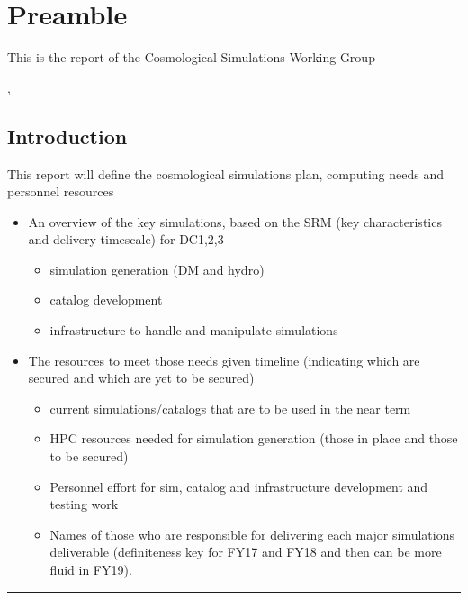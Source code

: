 \section{Preamble}
\resetnumbering
\label{sec:preamble}

This is the report of the Cosmological Simulations Working Group

\vspace{\baselineskip}

,




\subsection{Introduction}
\label{sec:preamble:introduction}

This report will define the cosmological simulations plan, computing needs and personnel resources

\begin{itemize}
   \item    An overview of the key simulations, based on the SRM (key characteristics and delivery timescale) for DC1,2,3
     \begin{itemize}
        \item        simulation generation (DM and hydro)
        \item        catalog development
        \item        infrastructure to handle and manipulate simulations
     \end{itemize}
   \item    The resources to meet those needs given timeline (indicating which are secured and which are yet to be secured)
     \begin{itemize}
        \item        current simulations/catalogs that are to be used in the near term
        \item        HPC resources needed for simulation generation (those in place and those to be secured)
        \item        Personnel effort for sim, catalog and infrastructure development and testing work
        \item        Names of those who are responsible for delivering each major simulations deliverable (definiteness key for FY17 and FY18 and then can be more fluid in FY19).
     \end{itemize}
\end{itemize}


\vspace{\baselineskip}
\hrule
\clearpage
